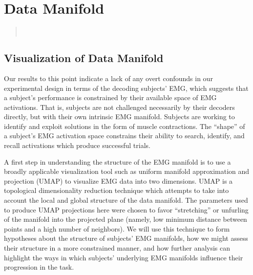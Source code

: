 \documentclass[../main.tex]{subfiles}
\begin{document}
\chapter{Data Manifold}\label{chap:data_manifold}


\begin{quote}
    \\
  \end{quote}

\cleardoublepage%




\section{Visualization of Data Manifold}

Our results to this point indicate a lack of any overt confounds in our experimental design in terms of the decoding subjects' EMG, which suggests that a subject's performance is constrained by their available space of EMG activations. That is, subjects are not challenged necessarily by their decoders directly, but with their own intrinsic EMG manifold. Subjects are working to identify and exploit solutions in the form of muscle contractions. The ``shape'' of a subject's EMG activation space constrains their ability to search, identify, and recall activations which produce successful trials.

A first step in understanding the structure of the EMG manifold is to use a broadly applicable visualization tool such as uniform manifold approximation and projection (UMAP) to visualize EMG data into two dimensions\cite{mcinnesUMAPUniformManifold2018}. UMAP is a topological dimensionality reduction technique which attempts to take into account the local and global structure of the data manifold. The parameters used to produce UMAP projections here were chosen to favor ``stretching'' or unfurling of the manifold into the projected plane (namely, low minimum distance between points and a high number of neighbors). We will use this technique to form hypotheses about the structure of subjects' EMG manifolds, how we might assess their structure in a more constrained manner, and how further analysis can highlight the ways in which subjects' underlying EMG manifolds influence their progression in the task. 
\end{document}
